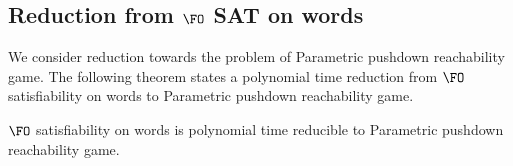 \subsection{Reduction from $\FO$ SAT on words}

We consider reduction towards the problem of {\sc Parametric pushdown reachability game}.
The following theorem states a polynomial time reduction from
{\sc $\FO$ satisfiability on words}
to %
{\sc Parametric pushdown reachability game}.


\begin{samepage}
\begin{theorem}
{\sc $\FO$ satisfiability on words} is polynomial time reducible to {\sc Parametric pushdown reachability game}.
\end{theorem}
\end{samepage}


